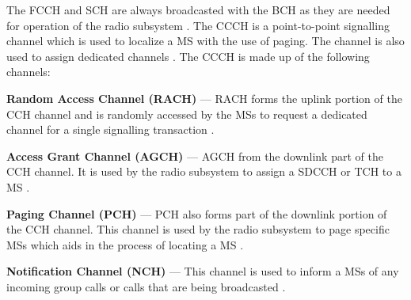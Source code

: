The FCCH and SCH are always broadcasted with the BCH as they are needed for operation of the radio subsystem \cite{GSMArchitectureProtocolsServices}. The CCCH is a point-to-point signalling channel which is used to localize a MS with the use of paging. The channel is also used to assign dedicated channels \cite{GSMArchitectureProtocolsServices}. The CCCH is made up of the following channels:
\begin{description}
\item{\textbf{Random Access Channel (RACH)}} --- RACH forms the uplink portion of the CCH channel and is randomly accessed by the MSs to request a dedicated channel for a single signalling transaction \cite{GSMArchitectureProtocolsServices}.
\item{\textbf{Access Grant Channel (AGCH)}} --- AGCH from the downlink part of the CCH channel. It is used by the radio subsystem to assign a SDCCH or TCH to a MS \cite{GSMArchitectureProtocolsServices}.
\item{\textbf{Paging Channel (PCH)}} --- PCH also forms part of the downlink portion of the CCH channel. This channel is used by the radio subsystem to page specific MSs which aids in the process of locating a MS \cite{GSMArchitectureProtocolsServices}.
\item{\textbf{Notification Channel (NCH)}} --- This channel is used to inform a MSs of any incoming group calls or calls that are being broadcasted \cite{GSMArchitectureProtocolsServices}.
\end{description}

